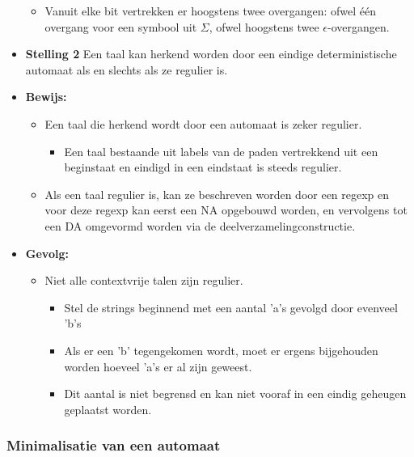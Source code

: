 \begin{itemize}
\begin{itemize}
        \item Vanuit elke bit vertrekken er hoogstens twee overgangen: ofwel één overgang voor een symbool uit $\Sigma$, ofwel hoogstens twee $\epsilon$-overgangen.
    \end{itemize}
    \item \textbf{Stelling 2} Een taal kan herkend worden door een eindige deterministische automaat als en slechts als ze regulier is.
    \item \textbf{Bewijs:}
    \begin{itemize}
        \item Een taal die herkend wordt door een automaat is zeker regulier.
        \begin{itemize}
            \item Een taal bestaande uit labels van de paden vertrekkend uit een beginstaat en eindigd in een eindstaat is steeds regulier.
        \end{itemize}
        \item Als een taal regulier is, kan ze beschreven worden door een regexp en voor deze regexp kan eerst een NA opgebouwd worden, en vervolgens tot een DA omgevormd worden via de deelverzamelingconstructie.
    \end{itemize}
    \item \textbf{Gevolg:}
    \begin{itemize}
        \item Niet alle contextvrije talen zijn regulier.
        \begin{itemize}
            \item Stel de strings beginnend met een aantal 'a's gevolgd door evenveel 'b's
            \item Als er een 'b' tegengekomen wordt, moet er ergens bijgehouden worden hoeveel 'a's er al zijn geweest.
            \item Dit aantal is niet begrensd en kan niet vooraf in een eindig geheugen geplaatst worden.
        \end{itemize}
    \end{itemize}
\end{itemize}

\subsubsection{Minimalisatie van een automaat}



